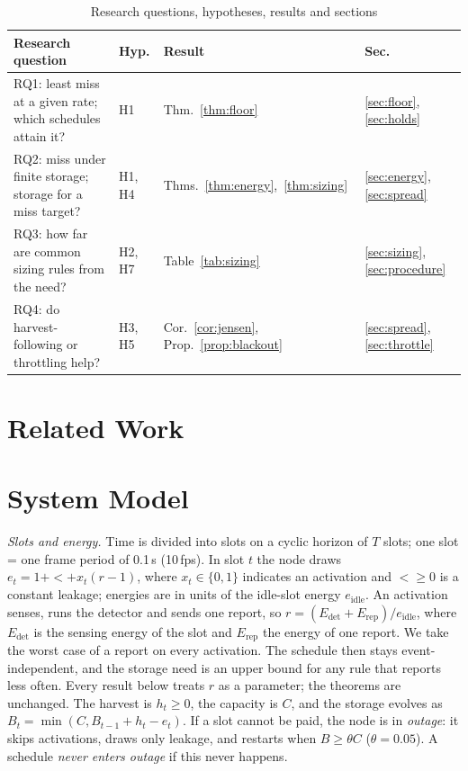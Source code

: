 \begin{table}[!t]\centering
\caption{Research questions, hypotheses, results and sections}\label{tab:rq}
\footnotesize\setlength{\tabcolsep}{3pt}
\begin{tabular}{@{}p{}lll@{}}\toprule
Research question & Hyp. & Result & Sec.\\\midrule
RQ1: least miss at a given rate; which schedules attain it? & H1 & Thm.~\ref{thm:floor} & \ref{sec:floor}, \ref{sec:holds}\\
RQ2: miss under finite storage; storage for a miss target? & H1, H4 & Thms.~\ref{thm:energy},~\ref{thm:sizing} & \ref{sec:energy}, \ref{sec:spread}\\
RQ3: how far are common sizing rules from the need? & H2, H7 & Table~\ref{tab:sizing} & \ref{sec:sizing}, \ref{sec:procedure}\\
RQ4: do harvest-following or throttling help? & H3, H5 & Cor.~\ref{cor:jensen}, Prop.~\ref{prop:blackout} & \ref{sec:spread}, \ref{sec:throttle}\\\bottomrule
\end{tabular}
\end{table}

\section{Related Work}\label{sec:related}


\section{System Model}\label{sec:model}
\emph{Slots and energy.} Time is divided into slots on a cyclic horizon of $T$ slots; one slot = one frame period of 0.1\,s (10\,fps). In slot $t$ the node draws $e_t=1+\lt+x_t(r-1)$, where $x_t\in\{0,1\}$ indicates an activation and $\lt\ge0$ is a constant leakage; energies are in units of the idle-slot energy $e_{\mathrm{idle}}$. An activation senses, runs the detector and sends one report, so $r=(E_{\mathrm{det}}+E_{\mathrm{rep}})/e_{\mathrm{idle}}$, where $E_{\mathrm{det}}$ is the sensing energy of the slot and $E_{\mathrm{rep}}$ the energy of one report. We take the worst case of a report on every activation. The schedule then stays event-independent, and the storage need is an upper bound for any rule that reports less often. Every result below treats $r$ as a parameter; the theorems are unchanged. The harvest is $h_t\ge0$, the capacity is $C$, and the storage evolves as $B_t=\min(C,B_{t-1}+h_t-e_t)$. If a slot cannot be paid, the node is in \emph{outage}: it skips activations, draws only leakage, and restarts when $B\ge\theta C$ ($\theta=0.05$). A schedule \emph{never enters outage} if this never happens.

